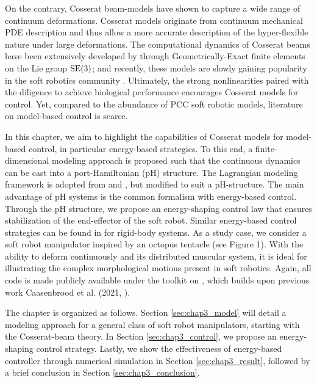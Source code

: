 On the contrary, Cosserat beam-models have shown to capture a wide range of continuum deformations. Cosserat models originate from continuum mechanical PDE description and thus allow a more accurate description of the hyper-flexible nature under large deformations. The computational dynamics of Cosserat beams have been extensively developed by \cite{Simo1986} through Geometrically-Exact finite elements on the Lie group $\textup{\textrm{SE}}(3)$; and recently, these models are slowly gaining popularity in the soft robotics community \cite{Renda2018,Renda2020,Boyer2021,Till2019}. Ultimately, the strong nonlinearities paired with the diligence to achieve biological performance encourages Cosserat models for control. Yet, compared to the abundance of PCC soft robotic models, literature on model-based control is scarce.

In this chapter, we aim to highlight the capabilities of Cosserat models for model-based control, in particular energy-based strategies. To this end, a finite-dimensional modeling approach is proposed such that the continuous dynamics can be cast into a port-Hamiltonian (pH) structure. The Lagrangian modeling framework is adopted from \cite{Boyer2021} and \cite{Renda2020}, but modified to suit a pH-structure. The main advantage of pH systems is the common formalism with energy-based control. Through the pH structure, we propose an energy-shaping control law that ensures stabilization of the end-effector of the soft robot. Similar energy-based control strategies can be found in \cite{Franco2020,Schaft2004,Ortega2002,Ortega1998} for rigid-body systems. As a study case, we consider a soft robot manipulator inspired by an octopus tentacle (see Figure 1). With the ability to deform continuously and its distributed muscular system, it is ideal for illustrating the complex morphological motions present in soft robotics. Again, all code is made publicly available under the \sorotoki toolkit on \cite{SorotokiCode}, which builds upon previous work Caasenbrood et al. (2021, \cite{Caasenbrood2021}).

The chapter is organized as follows. Section \ref{sec:chap3_model} will detail a modeling approach for a general class of soft robot manipulators, starting with the Cosserat-beam theory. In Section \ref{sec:chap3_control}, we propose an energy-shaping control strategy. Lastly, we show the effectiveness of energy-based controller through numerical simulation in Section  \ref{sec:chap3_result}, followed by a brief conclusion in Section  \ref{sec:chap3_conclusion}.
